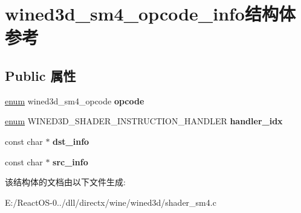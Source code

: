 \hypertarget{structwined3d__sm4__opcode__info}{}\section{wined3d\+\_\+sm4\+\_\+opcode\+\_\+info结构体 参考}
\label{structwined3d__sm4__opcode__info}
\subsection*{Public 属性}
\begin{DoxyCompactItemize}
\item 
\mbox{\label{structwined3d__sm4__opcode__info_aff3288c0dc79b45dbb83691701f83798}} 
\hyperlink{interfaceenum}{enum} wined3d\+\_\+sm4\+\_\+opcode {\bfseries opcode}
\item 
\mbox{\label{structwined3d__sm4__opcode__info_a50a1c80a6ec0671290ba1b721891f8dc}} 
\hyperlink{interfaceenum}{enum} W\+I\+N\+E\+D3\+D\+\_\+\+S\+H\+A\+D\+E\+R\+\_\+\+I\+N\+S\+T\+R\+U\+C\+T\+I\+O\+N\+\_\+\+H\+A\+N\+D\+L\+ER {\bfseries handler\+\_\+idx}
\item 
\mbox{\label{structwined3d__sm4__opcode__info_a2903843af4fbe2a94f5969acb22f8e32}} 
const char $\ast$ {\bfseries dst\+\_\+info}
\item 
\mbox{\label{structwined3d__sm4__opcode__info_a3420022e6d7d5c57a84ea436fbca0c37}} 
const char $\ast$ {\bfseries src\+\_\+info}
\end{DoxyCompactItemize}


该结构体的文档由以下文件生成\+:\begin{DoxyCompactItemize}
\item 
E\+:/\+React\+O\+S-\/0../dll/directx/wine/wined3d/shader\+\_\+sm4.\+c\end{DoxyCompactItemize}
